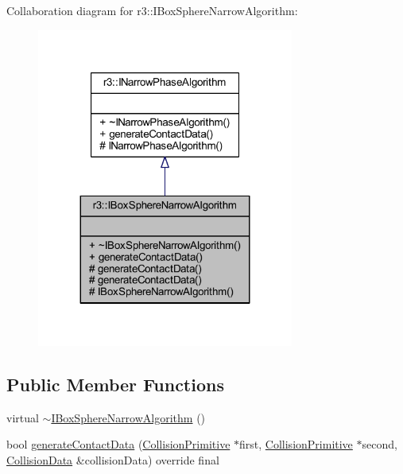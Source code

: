 Collaboration diagram for r3\+:\+:I\+Box\+Sphere\+Narrow\+Algorithm\+:\nopagebreak
\begin{figure}[H]
\begin{center}
\leavevmode
\includegraphics[width=239pt]{classr3_1_1_i_box_sphere_narrow_algorithm__coll__graph}
\end{center}
\end{figure}
\subsection*{Public Member Functions}
\begin{DoxyCompactItemize}
\item 
virtual \mbox{\hyperlink{classr3_1_1_i_box_sphere_narrow_algorithm_ac70f8e99bb2deb52c1e4686ef6fafe2d}{$\sim$\+I\+Box\+Sphere\+Narrow\+Algorithm}} ()
\item 
bool \mbox{\hyperlink{classr3_1_1_i_box_sphere_narrow_algorithm_a1e363eb4629664d3c7fb6b710c66a3ce}{generate\+Contact\+Data}} (\mbox{\hyperlink{classr3_1_1_collision_primitive}{Collision\+Primitive}} $\ast$first, \mbox{\hyperlink{classr3_1_1_collision_primitive}{Collision\+Primitive}} $\ast$second, \mbox{\hyperlink{classr3_1_1_collision_data}{Collision\+Data}} \&collision\+Data) override final
\end{DoxyCompactItemize}
